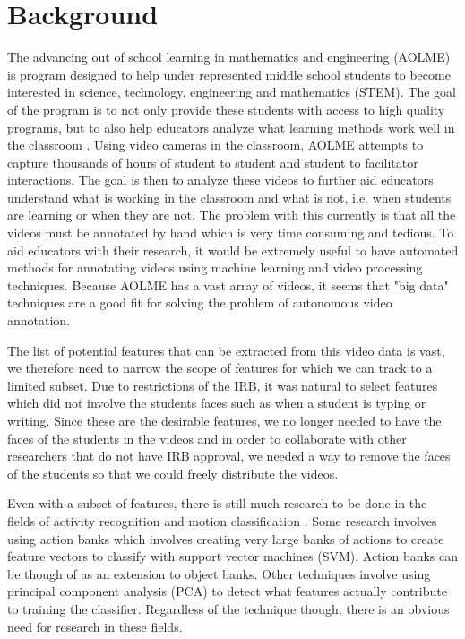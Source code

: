 \documentclass[
	submission,
	final,
	notitlepage,
	narroweqnarray,
	inline,
	twoside,
	]{ieee}
\begin{document}
\section{Background}
\PARstart The advancing out of school learning in mathematics and engineering (AOLME) is program designed to help under 
represented middle school students to become interested in science, technology, engineering and mathematics (STEM). The goal of
the program is to not only provide these students with access to high quality programs, but to also help educators analyze
what learning methods work well in the classroom \cite{aolme_paper}. Using video cameras in the classroom, AOLME attempts to capture 
thousands of hours of student to student and student to facilitator interactions. The goal is then to analyze these videos
to further aid educators understand what is working in the classroom and what is not, i.e. when students are learning or when they are not. 
The problem with this currently is that
all the videos must be annotated by hand which is very time consuming and tedious. To aid educators with their research, 
it would be extremely useful to have automated methods for annotating videos using machine learning and 
video processing techniques. Because AOLME has a vast array of videos, it seems that "big data" techniques are a
good fit for solving the problem of autonomous video annotation.

The list of potential features that can be extracted from this video data is vast, we
therefore need to narrow the scope of features for
which we can track to a limited subset. Due to restrictions of the IRB, 
it was natural to select features which did not involve the students faces
such as when a student is typing or writing. Since these are the desirable 
features, we no longer needed to have the faces of the students in the videos
and in order to collaborate with other researchers that do not have IRB
approval, we needed a way to remove the faces of the students so that
we could freely distribute the videos. 

Even with a subset of features, there is still much research to be done
in the fields of activity recognition and motion classification \cite{machine_perception}.
Some research involves using action banks \cite{action_bank} which involves
creating very large banks of actions to create feature vectors 
to classify with support vector machines (SVM). Action banks
can be though of as an extension to object banks. Other techniques involve 
using principal component analysis (PCA) \cite{face_recog_book} to 
detect what features actually contribute to training the classifier.
Regardless of the technique though, there is an obvious need for
research in these fields.
\end{document}

